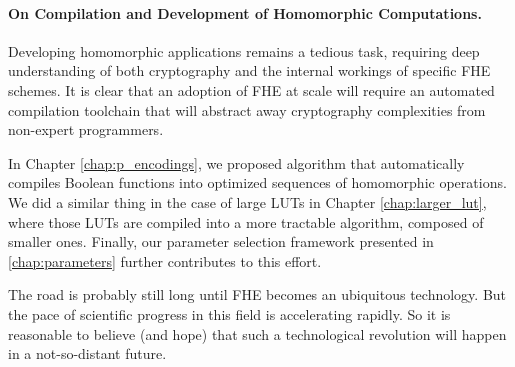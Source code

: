 \paragraph{On Compilation and Development of Homomorphic Computations.}
%

Developing homomorphic applications remains a tedious task, requiring deep understanding of both cryptography and the internal workings of specific \gls{FHE} schemes. It is clear that an adoption of \gls{FHE} at scale will require an automated compilation toolchain that will abstract away cryptography complexities from non-expert programmers.

In Chapter \ref{chap:p_encodings}, we proposed algorithm that automatically compiles Boolean functions into optimized sequences of homomorphic operations. We did a similar thing in the case of large LUTs in Chapter \ref{chap:larger_lut}, where those LUTs are compiled into a more tractable algorithm, composed of smaller ones. Finally, our parameter selection framework presented in \ref{chap:parameters} further contributes to this effort.


\bigskip

The road is probably still long until \gls{FHE} becomes an ubiquitous technology. But the pace of scientific progress in this field is accelerating rapidly. So it is reasonable to believe (and hope) that such a technological revolution will happen in a not-so-distant future.





